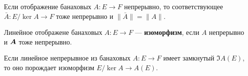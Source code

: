 
\begin{to_lem}
	Если отображение банаховых $A \colon E \to F$ непрерывно, то соответствующее $\bar{A} \colon E/\ker A \to F$ тоже непрерывно и $\|\bar{A}\| = \|A\|$.
\end{to_lem}

\begin{to_def}
	Линейное отображене банаховых $A \colon E \to F$ --- \textbf{изоморфизм}, если $A$ непрерывно и $\mbox{\boldmath $A$}$ тоже непрерывно.
\end{to_def}

\begin{to_def}
	Если линейное непрерывное из банаховых $A \colon E \to F$ имеет замкнутый $\Im A(E)$, то оно порождает изоморфизм $E/\ker A \to A(E)$.
\end{to_def}